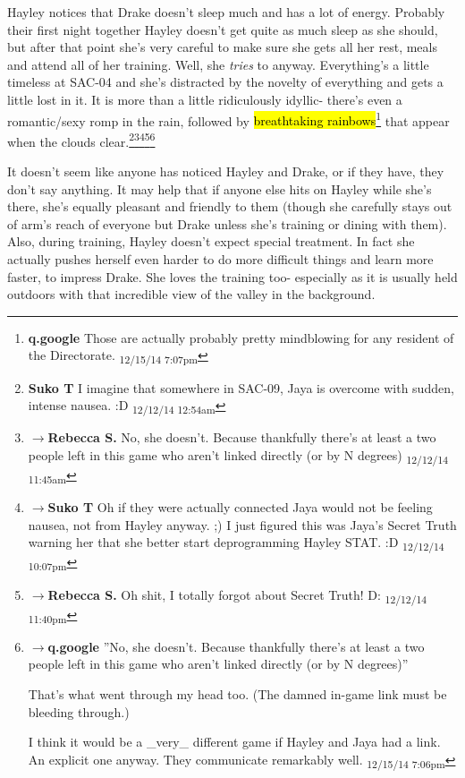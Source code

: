 Hayley notices that Drake doesn't sleep much and has a lot of energy.  Probably their first night together Hayley doesn't get quite as much sleep as she should, but after that point she's very careful to make sure she gets all her rest, meals and attend all of her training.  Well, she \textit{tries} to anyway.  Everything's a little timeless at SAC-04 and she's distracted by the novelty of everything and gets a little lost in it.  It is more than a little ridiculously idyllic- there's even a romantic/sexy romp in the rain, followed by \hl{breathtaking rainbows}\footnote{\textbf{q.google }Those are actually probably pretty mindblowing for any resident of the Directorate. \textsubscript{12/15/14 7:07pm}} that appear when the clouds clear.\footnote{\textbf{Suko T }I imagine that somewhere in SAC-09, Jaya is overcome with sudden, intense nausea. :D \textsubscript{12/12/14 12:54am}}\footnote{$\rightarrow$\textbf{Rebecca S. }No, she doesn't.  Because thankfully there's at least a two people left in this game who aren't linked directly (or by N degrees) \textsubscript{12/12/14 11:45am}}\footnote{$\rightarrow$\textbf{Suko T }Oh if they were actually connected Jaya would not be feeling nausea, not from Hayley anyway. ;)   I just figured this was Jaya's Secret Truth warning her that she better start deprogramming Hayley STAT.  :D \textsubscript{12/12/14 10:07pm}}\footnote{$\rightarrow$\textbf{Rebecca S. }Oh shit, I totally forgot about Secret Truth! D: \textsubscript{12/12/14 11:40pm}}\footnote{$\rightarrow$\textbf{q.google }''No, she doesn't. Because thankfully there's at least a two people left in this game who aren't linked directly (or by N degrees)''

That's what went through my head too.  (The damned in-game link must be bleeding through.)

I think it would be a \_very\_ different game if Hayley and Jaya had a link.  An explicit one anyway.  They communicate remarkably well. \textsubscript{12/15/14 7:06pm}}



It doesn't seem like anyone has noticed Hayley and Drake, or if they have, they don't say anything.  It may help that if anyone else hits on Hayley while she's there, she's equally pleasant and friendly to them (though she carefully stays out of arm's reach of everyone but Drake unless she's training or dining with them).  Also, during training, Hayley doesn't expect special treatment.  In fact she actually pushes herself even harder to do more difficult things and learn more faster, to impress Drake.  She loves the training too- especially as it is usually held outdoors with that incredible view of the valley in the background.



